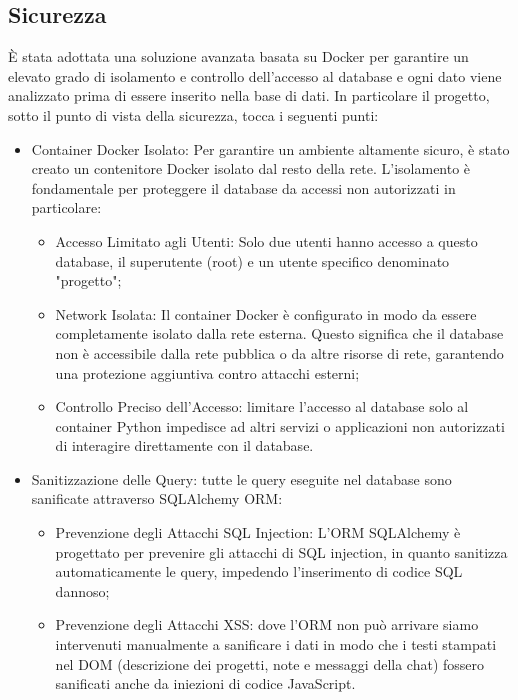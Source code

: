\documentclass{article}
\begin{document}
\subsection{Sicurezza}
È stata adottata una soluzione avanzata basata su Docker per garantire un elevato grado di isolamento e controllo dell'accesso al database e ogni dato viene analizzato prima di essere inserito nella base di dati.
In particolare il progetto, sotto il punto di vista della sicurezza, tocca i seguenti punti:
\begin{itemize}
    \item Container Docker Isolato: Per garantire un ambiente altamente sicuro, è stato creato un contenitore Docker isolato dal resto della rete. L'isolamento è fondamentale per proteggere il database da accessi non autorizzati in particolare: 
    \begin{itemize}
        \item Accesso Limitato agli Utenti: Solo due utenti hanno accesso a questo database, il superutente (root) e un utente specifico denominato "progetto";
        \item Network Isolata: Il container Docker è configurato in modo da essere completamente isolato dalla rete esterna. Questo significa che il database non è accessibile dalla rete pubblica o da altre risorse di rete, garantendo una protezione aggiuntiva contro attacchi esterni;
        \item Controllo Preciso dell'Accesso: limitare l'accesso al database solo al container Python impedisce ad altri servizi o applicazioni non autorizzati di interagire direttamente con il database.
    \end{itemize}
    \item Sanitizzazione delle Query: tutte le query eseguite nel database sono sanificate attraverso SQLAlchemy ORM:
    \begin{itemize}
        \item Prevenzione degli Attacchi SQL Injection: L'ORM SQLAlchemy è progettato per prevenire gli attacchi di SQL injection, in quanto sanitizza automaticamente le query, impedendo l'inserimento di codice SQL dannoso;
        \item Prevenzione degli Attacchi XSS: dove l'ORM non può arrivare siamo intervenuti manualmente a sanificare i dati in modo che i testi stampati nel DOM (descrizione dei progetti, note e messaggi della chat) fossero sanificati anche da iniezioni di codice JavaScript.
    \end{itemize}
\end{itemize}
\end{document}
